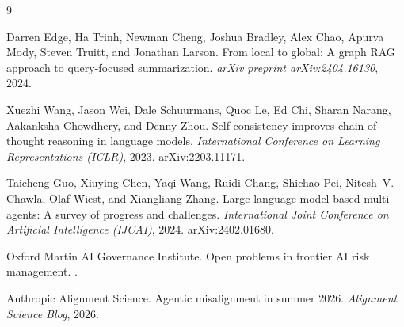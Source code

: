 \documentclass{article}
\begin{document}

\begin{thebibliography}{9}

Darren Edge, Ha Trinh, Newman Cheng, Joshua Bradley, Alex Chao, Apurva
Mody, Steven Truitt, and Jonathan Larson.
\newblock From local to global: A graph {RAG} approach to query-focused
summarization.
\newblock \emph{arXiv preprint arXiv:2404.16130}, 2024.

Xuezhi Wang, Jason Wei, Dale Schuurmans, Quoc Le, Ed Chi, Sharan Narang,
Aakanksha Chowdhery, and Denny Zhou.
\newblock Self-consistency improves chain of thought reasoning in language
models.
\newblock \emph{International Conference on Learning Representations
(ICLR)}, 2023. arXiv:2203.11171.

Taicheng Guo, Xiuying Chen, Yaqi Wang, Ruidi Chang, Shichao Pei, Nitesh~V.
Chawla, Olaf Wiest, and Xiangliang Zhang.
\newblock Large language model based multi-agents: A survey of progress
and challenges.
\newblock \emph{International Joint Conference on Artificial Intelligence
(IJCAI)}, 2024. arXiv:2402.01680.

Oxford Martin AI Governance Institute.
\newblock Open problems in frontier {AI} risk management.
.

Anthropic Alignment Science.
\newblock Agentic misalignment in summer 2026.
\newblock \emph{Alignment Science Blog}, 2026.

\end{thebibliography}

\newpage

\end{document}
